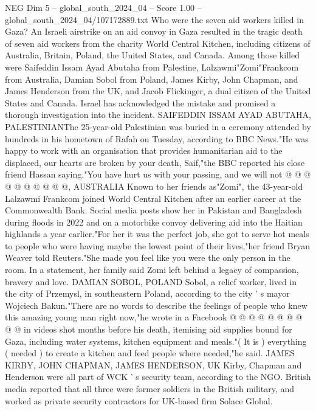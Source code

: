 \begin{textsample}{NEG Dim 5 – global\_south\_2024\_04 – Score 1.00 – global\_south\_2024\_04/107172889.txt}  \label{ex:f5_neg_120}
Who were the seven aid workers killed in Gaza?
An Israeli airstrike on an aid convoy in Gaza resulted in the tragic death of seven aid workers from the charity World Central Kitchen, including citizens of Australia, Britain, Poland, the United States, and Canada.
Among those killed were Saifeddin Issam Ayad Abutaha from Palestine, Lalzawmi"Zomi"Frankcom from Australia, Damian Sobol from Poland, James Kirby, John Chapman, and James Henderson from the UK, and Jacob Flickinger, a dual citizen of the United States and Canada.
Israel has acknowledged the mistake and promised a thorough investigation into the incident.
SAIFEDDIN ISSAM AYAD ABUTAHA, PALESTINIANThe 25-year-old Palestinian was buried in a ceremony attended by hundreds in his hometown of Rafah on Tuesday, according to BBC News."He was happy to work with an organisation that provides humanitarian aid to the displaced, our hearts are broken by your death, Saif,"the BBC reported his close friend Hassan saying."You have hurt us with your passing, and we will not @ @ @ @ @ @ @ @ @ @, AUSTRALIA Known to her friends as"Zomi", the 43-year-old Lalzawmi Frankcom joined World Central Kitchen after an earlier career at the Commonwealth Bank.
Social media posts show her in Pakistan and Bangladesh during floods in 2022 and on a motorbike convoy delivering aid into the Haitian highlands a year earlier."For her it was the perfect job, she got to serve hot meals to people who were having maybe the lowest point of their lives,"her friend Bryan Weaver told Reuters."She made you feel like you were the only person in the room.
In a statement, her family said Zomi left behind a legacy of compassion, bravery and love.
DAMIAN SOBOL, POLAND Sobol, a relief worker, lived in the city of Przemysl, in southeastern Poland, according to the city ' s mayor Wojciech Bakun."There are no words to describe the feelings of people who knew this amazing young man right now,"he wrote in a Facebook @ @ @ @ @ @ @ @ @ @ in videos shot months before his death, itemising aid supplies bound for Gaza, including water systems, kitchen equipment and meals."( It is ) everything ( needed ) to create a kitchen and feed people where needed,"he said.
JAMES KIRBY, JOHN CHAPMAN, JAMES HENDERSON, UK Kirby, Chapman and Henderson were all part of WCK ' s security team, according to the NGO.
British media reported that all three were former soldiers in the British military, and worked as private security contractors for UK-based firm Solace Global.

\end{textsample}
